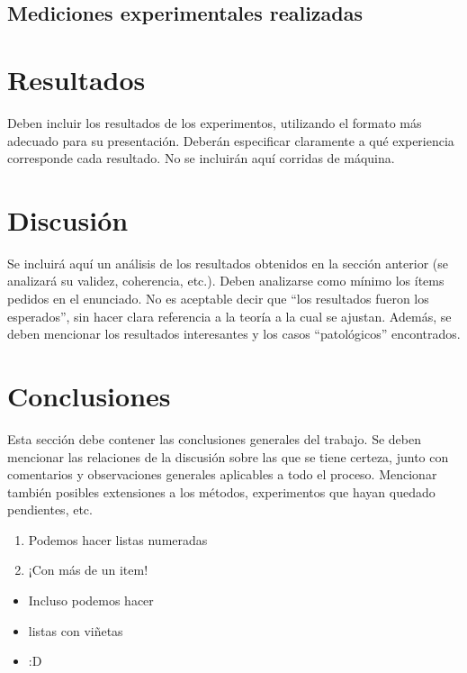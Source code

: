 \documentclass[11pt, a4paper, spanish]{article}
\theoremstyle{plain}
\theoremstyle{remark}
\begin{document}
  \subsection{Mediciones experimentales realizadas}




\section{Resultados}

  Deben incluir los resultados de los experimentos, utilizando el formato más adecuado para su presentación. Deberán especificar claramente a qué experiencia corresponde cada resultado. No se incluirán aquí corridas de máquina.

\section{Discusión}

  Se incluirá aquí un análisis de los resultados obtenidos en la sección anterior (se analizará su validez, coherencia, etc.). Deben analizarse como mínimo los ítems pedidos en el enunciado. No es aceptable decir que ``los resultados fueron los esperados'', sin hacer clara referencia a la teoría a la cual se ajustan. Además, se deben mencionar los resultados interesantes y los casos ``patológicos'' encontrados.

\section{Conclusiones}

  Esta sección debe contener las conclusiones generales del trabajo. Se deben mencionar las relaciones de la discusión sobre las que se tiene certeza, junto con comentarios y observaciones generales aplicables a todo el proceso. Mencionar también posibles extensiones a los métodos, experimentos que hayan quedado pendientes, etc.

  \begin{enumerate}
    \item Podemos hacer listas numeradas
    \item ¡Con más de un item!
  \end{enumerate}

  \begin{itemize}
    \item Incluso podemos hacer
    \item listas con viñetas
    \item :D
  \end{itemize}
\end{document}
